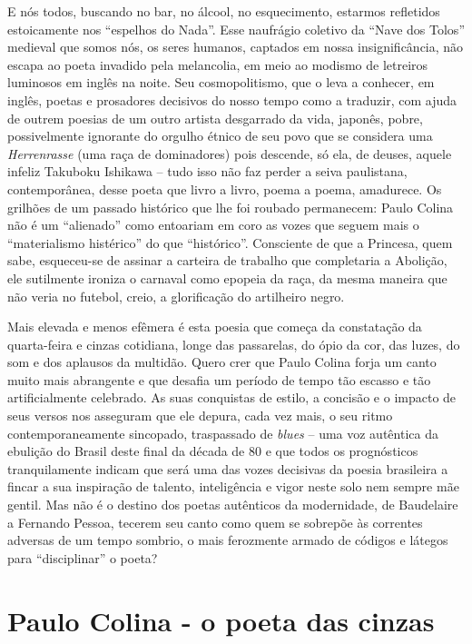 \documentclass[
  letterpaper,
  DIV=11,
  numbers=noendperiod]{scrreprt}
\begin{document}
E nós todos, buscando no bar, no álcool, no esquecimento, estarmos
refletidos estoicamente nos ``espelhos do Nada''. Esse naufrágio
coletivo da ``Nave dos Tolos'' medieval que somos nós, os seres humanos,
captados em nossa insignificância, não escapa ao poeta invadido pela
melancolia, em meio ao modismo de letreiros luminosos em inglês na
noite. Seu cosmopolitismo, que o leva a conhecer, em inglês, poetas e
prosadores decisivos do nosso tempo como a traduzir, com ajuda de outrem
poesias de um outro artista desgarrado da vida, japonês, pobre,
possivelmente ignorante do orgulho étnico de seu povo que se considera
uma \emph{Herrenrasse} (uma raça de dominadores) pois descende, só ela,
de deuses, aquele infeliz Takuboku Ishikawa -- tudo isso não faz perder
a seiva paulistana, contemporânea, desse poeta que livro a livro, poema
a poema, amadurece. Os grilhões de um passado histórico que lhe foi
roubado permanecem: Paulo Colina não é um ``alienado'' como entoariam em
coro as vozes que seguem mais o ``materialismo histérico'' do que
``histórico''. Consciente de que a Princesa, quem sabe, esqueceu-se de
assinar a carteira de trabalho que completaria a Abolição, ele
sutilmente ironiza o carnaval como epopeia da raça, da mesma maneira que
não veria no futebol, creio, a glorificação do artilheiro negro.

Mais elevada e menos efêmera é esta poesia que começa da constatação da
quarta-feira e cinzas cotidiana, longe das passarelas, do ópio da cor,
das luzes, do som e dos aplausos da multidão. Quero crer que Paulo
Colina forja um canto muito mais abrangente e que desafia um período de
tempo tão escasso e tão artificialmente celebrado. As suas conquistas de
estilo, a concisão e o impacto de seus versos nos asseguram que ele
depura, cada vez mais, o seu ritmo contemporaneamente sincopado,
traspassado de \emph{blues} -- uma voz autêntica da ebulição do Brasil
deste final da década de 80 e que todos os prognósticos tranquilamente
indicam que será uma das vozes decisivas da poesia brasileira a fincar a
sua inspiração de talento, inteligência e vigor neste solo nem sempre
mãe gentil. Mas não é o destino dos poetas autênticos da modernidade, de
Baudelaire a Fernando Pessoa, tecerem seu canto como quem se sobrepõe às
correntes adversas de um tempo sombrio, o mais ferozmente armado de
códigos e látegos para ``disciplinar'' o poeta?

\chapter{Paulo Colina - o poeta das
cinzas}\label{paulo-colina---o-poeta-das-cinzas}
\end{document}
